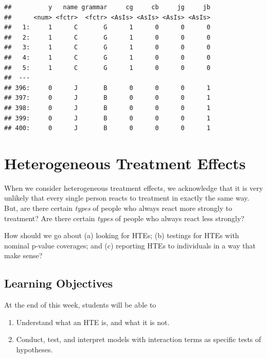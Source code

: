 \documentclass[
]{article}
\providecommand{\tightlist}{%
  \setlength{\itemsep}{0pt}\setlength{\parskip}{0pt}}
\begin{document}
\begin{verbatim}
##          y   name grammar     cg     cb     jg     jb
##      <num> <fctr>  <fctr> <AsIs> <AsIs> <AsIs> <AsIs>
##   1:     1      C       G      1      0      0      0
##   2:     1      C       G      1      0      0      0
##   3:     1      C       G      1      0      0      0
##   4:     1      C       G      1      0      0      0
##   5:     1      C       G      1      0      0      0
##  ---                                                 
## 396:     0      J       B      0      0      0      1
## 397:     0      J       B      0      0      0      1
## 398:     0      J       B      0      0      0      1
## 399:     0      J       B      0      0      0      1
## 400:     0      J       B      0      0      0      1
\end{verbatim}

\hypertarget{heterogeneous-treatment-effects}{%
\section{Heterogeneous Treatment Effects}\label{heterogeneous-treatment-effects}}

When we consider heterogeneous treatment effects, we acknowledge that it is very unlikely that every single person reacts to treatment in exactly the same way. But, are there certain \emph{types} of people who always react more strongly to treatment? Are there certain \emph{types} of people who always react less strongly?

How should we go about (a) looking for HTEs; (b) testings for HTEs with nominal p-value coverages; and (c) reporting HTEs to individuals in a way that make sense?

\hypertarget{learning-objectives-6}{%
\subsection{Learning Objectives}\label{learning-objectives-6}}

At the end of this week, students will be able to

\begin{enumerate}
\def\labelenumi{\arabic{enumi}.}
\tightlist
\item
  Understand what an HTE is, and what it is not.
\item
  Conduct, test, and interpret models with interaction terms as specific tests of hypotheses.
\end{enumerate}
\end{document}
